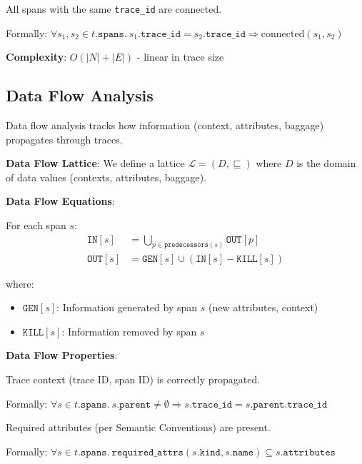\begin{property}[Consistency (CF3)]
\label{prop:cf3}
All spans with the same \texttt{trace\_id} are connected.

Formally: $\forall s_1, s_2 \in t.\texttt{spans}.\ s_1.\texttt{trace\_id} = s_2.\texttt{trace\_id} \Rightarrow \text{connected}(s_1, s_2)$
\end{property}

\textbf{Complexity}: $O(|N| + |E|)$ - linear in trace size

\subsection{Data Flow Analysis}
\label{sec:data-flow}

Data flow analysis tracks how information (context, attributes, baggage) propagates through traces.

\textbf{Data Flow Lattice}: We define a lattice $\mathcal{L} = (D, \sqsubseteq)$ where $D$ is the domain of data values (contexts, attributes, baggage).

\textbf{Data Flow Equations}:

For each span $s$:
\begin{align*}
\texttt{IN}[s] &= \bigcup_{p \in \texttt{predecessors}(s)} \texttt{OUT}[p] \\
\texttt{OUT}[s] &= \texttt{GEN}[s] \cup (\texttt{IN}[s] - \texttt{KILL}[s])
\end{align*}

where:
\begin{itemize}
\item $\texttt{GEN}[s]$: Information generated by span $s$ (new attributes, context)
\item $\texttt{KILL}[s]$: Information removed by span $s$
\end{itemize}

\textbf{Data Flow Properties}:

\begin{property}
\label{prop:df1}
Trace context (trace ID, span ID) is correctly propagated.

Formally: $\forall s \in t.\texttt{spans}.\ s.\texttt{parent} \neq \emptyset \Rightarrow s.\texttt{trace\_id} = s.\texttt{parent}.\texttt{trace\_id}$
\end{property}

\begin{property}
\label{prop:df2}
Required attributes (per Semantic Conventions) are present.

Formally: $\forall s \in t.\texttt{spans}.\ \texttt{required\_attrs}(s.\texttt{kind}, s.\texttt{name}) \subseteq s.\texttt{attributes}$
\end{property}

